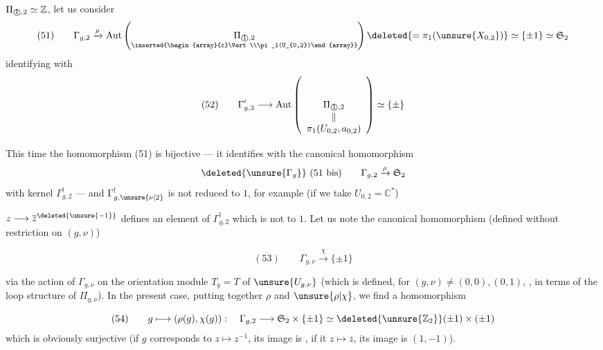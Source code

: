  $\Pi_{\text{\textcircled{1}},2}\simeq\mathbb{Z}$, let us consider
\[
(51)\qquad\Gamma_{g,2}\xrightarrow{\rho}\operatorname{Aut}\left(\underset{\inserted{\begin{array}{c}\Vert\\\pi_1(U_{0,2})\end{array}}}{\Pi_{\text{\textcircled{1}},2}}\right)\deleted{=\pi_1(\unsure{X_{0,2}})}\simeq\{\pm1\}\simeq\mathfrak S_2
\]
identifying with
\[
(52)\qquad\Gamma'_{g,3}\longrightarrow\operatorname{Aut}\left(\underset{\begin{array}{c}\Vert\\\pi_1(U_{0,2},a_{0,2})\end{array}}{\Pi_{\text{\textcircled{1}},2}}\right)\simeq\{\pm\}
\]

This time the homomorphism (51) is  bijective --- it identifies with the canonical homomorphism
\[
\deleted{\unsure{\Gamma_g}}\ (51\text{ bis})\qquad\Gamma_{g,2}\xrightarrow{\rho}\mathfrak S_2
\]
with kernel $\Gamma^!_{g,2}$ --- and $\Gamma^!_{g,\unsure{\nu|2}}$ is not reduced to $1$, for example (if we take $U_{0,2}=\mathbb{C}^*$)

$z\longrightarrow\overline z^{\deleted{\unsure{-1}}}$ defines an element of $\Gamma^!_{g,2}$ which is not  to $1$. Let us note   the canonical homomorphism (defined without restriction on $(g,\nu)$)

\[
(53)\qquad\Gamma_{g,\nu}\xrightarrow{\chi}\{\pm1\}
\]

via the action of $\Gamma_{g,\nu}$ on the orientation module $T_g=T$ of $\unsure{U_{g,\nu}}$  (which is defined, for $(g,\nu)\neq(0,0),(0,1)$, , in terms of the loop structure of $\Pi_{g,\nu}$). In the present case, putting together $\rho$ and $\unsure{\rho|\chi}$, we find a homomorphism

\[
(54)\qquad g\longmapsto(\rho(g),\chi(g)):\quad\Gamma_{g,2}\longrightarrow\mathfrak S_2\times\{\pm1\}
\simeq\deleted{\unsure{\mathbb{Z}_2}}(\pm1)\times(\pm1)
\]
which is obviously surjective (if $g$ corresponds to $z\longmapsto z^{-1}$, its image is , if it  $z\longmapsto\overline z$, its image is $(1,-1)$).

